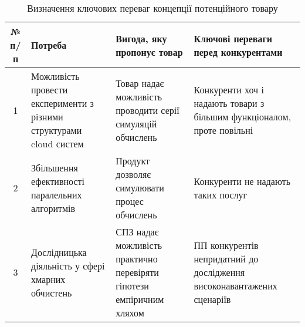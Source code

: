 \begin{table}[H]
	\centering
	\caption{Визначення ключових переваг концепції потенційного товару}
	\begin{tabular}{|c|P{4cm}|P{4cm}|P{4cm}|} \hline
		№ п/п
		& Потреба
		& Вигода, яку пропонує товар
		& Ключові переваги перед конкурентами 
		\\ \hline
		
		1
		& Можливість провести експерименти з різними структурами cloud систем
		& Товар надає можливість проводити серії симуляцій обчислень
		& Конкуренти хоч і надають товари з більшим функціоналом, проте повільні
		\\ \hline
		
		2
		& Збільшення ефективності паралельних алгоритмів
		& Продукт дозволяє симулювати процес обчислень
		& Конкуренти не надають таких послуг
		\\ \hline
		
		3
		& Дослідницька діяльність у сфері хмарних обчистень
		& СПЗ надає можливість практично перевіряти гіпотези емпіричним хляхом
		& ПП конкурентів непридатний до дослідження високонавантажених сценаріїв
		\\ \hline
	\end{tabular}
\end{table}


